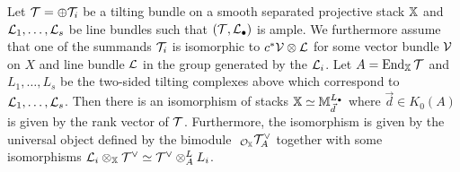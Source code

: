 \documentclass[12pt]{amsart}
\begin{document}
\begin{theorem}  \label{thm:stackfromquiver}
Let $\mathcal{T} = \oplus \mathcal{T}_i$ be a tilting bundle on a smooth separated projective stack $\mathbb{X}$ and $\mathcal{L}_1, \ldots, \mathcal{L}_s$ be line bundles such that $(\mathcal{T}, \mathcal{L}_{\bullet})$ is ample. We furthermore assume that one of the summands $\mathcal{T}_i$ is isomorphic to $c^* \mathcal{V} \otimes \mathcal{L}$ for some vector bundle $\mathcal{V}$ on $X$ and line bundle $\mathcal{L}$ in the group generated by the $\mathcal{L}_i$. Let $A = \operatorname{End}_{\mathbb{X}} \mathcal{T}$ and $L_1, \ldots, L_s$ be the two-sided tilting complexes above which correspond to $\mathcal{L}_1,\ldots, \mathcal{L}_s$. Then there is an isomorphism of stacks $\mathbb{X} \simeq \mathbb{M}^{L_{\bullet}}_{\vec{d}}$ where $\vec{d} \in K_0(A)$ is given by the rank vector of $\mathcal{T}$. Furthermore, the isomorphism is given by the universal object defined by the bimodule $\ _{\cO_{\bX}}\cT^{\vee}_A$ together with some isomorphisms $ \mathcal{L}_i \otimes_{\mathbb{X}} \mathcal{T}^{\vee} \simeq \mathcal{T}^{\vee} \otimes_A^L L_i$. 
\end{theorem}
\end{document}
